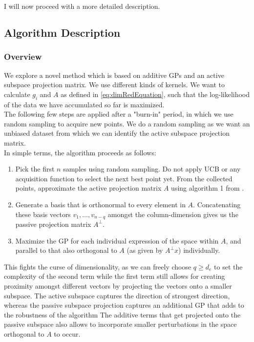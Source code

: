 I will now proceed with a more detailed description.

\subsection{Algorithm Description}

\subsubsection{Overview}

We explore a novel method which is based on additive GPs and an active subspace projection matrix.
We use different kinds of kernels.
We want to calculate $g_i$ and $A$ as defined in \ref{eq:dimRedEquation}, such that the log-likelihood of the data we have accumulated so far is maximized.\\
 
 The following few steps are applied after a "burn-in" period, in which we use random sampling to acquire new points.
 We do a random sampling as we want an unbiased dataset from which we can identify the active subspace projection matrix. \\
 
 In simple terms, the algorithm proceeds as follows:
 
 \begin{enumerate}
 \item Pick the first $n$ samples using random sampling.
 Do not apply UCB or any acquisition function to select the next best point yet.
 From the collected points, approximate the active projection matrix $A$ using algorithm 1 from \citep{Tripathy}.
 \item Generate a basis that is orthonormal to every element in $A$.
 Concatenating these basis vectors $v_1, \ldots, v_{n-{q}}$ amongst the column-dimension gives us the passive projection matrix $A^\bot$.
 \item Maximize the GP for each individual expression of the space within $A$, and parallel to that also orthogonal to $A$ (as given by $A^\bot x$) individually. 
 \end{enumerate}
 
 This fights the curse of dimensionality, as we can freely choose $q \geq d_e$ to set the complexity of the second term while the first term still allows for creating proximity amongst different vectors by projecting the vectors onto a smaller subspace.
The active subspace captures the direction of strongest direction, whereas the passive subspace projection captures an additional GP that adds to the robustness of the algorithm
The additive terms that get projected onto the passive subspace also allows to incorporate smaller perturbations in the space orthogonal to $A$ to occur.

